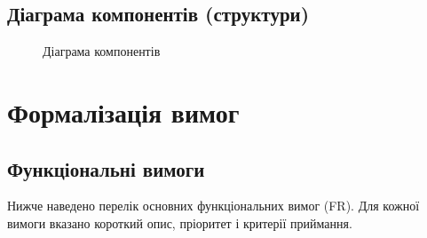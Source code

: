 \documentclass[14pt,a4paper]{extarticle}
\begin{document}
\subsection{Діаграма компонентів (структури)}
\begin{figure}[H]
  \centering
  \caption{Діаграма компонентів}
  \label{fig:components}
\end{figure}

\section{Формалізація вимог}
\subsection{Функціональні вимоги}
Нижче наведено перелік основних функціональних вимог (FR). Для кожної вимоги вказано короткий опис, пріоритет і критерії приймання.
\end{document}
